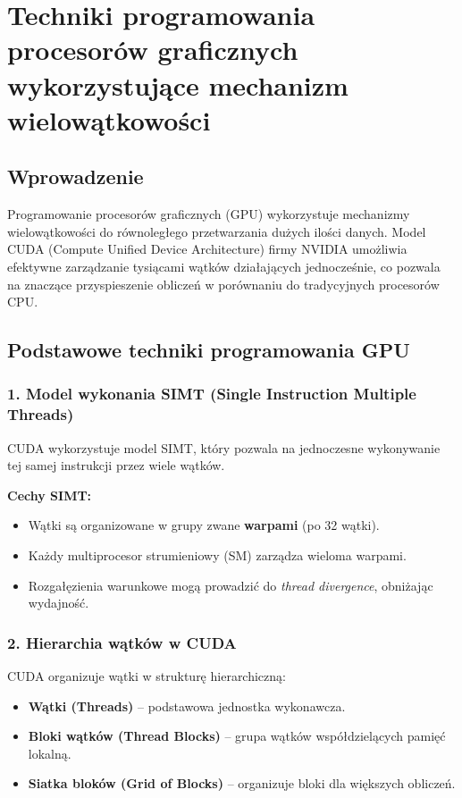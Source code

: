 \section{Techniki programowania procesorów graficznych wykorzystujące mechanizm wielowątkowości}

\subsection{Wprowadzenie}
Programowanie procesorów graficznych (GPU) wykorzystuje mechanizmy wielowątkowości do równoległego przetwarzania dużych ilości danych. Model CUDA (Compute Unified Device Architecture) firmy NVIDIA umożliwia efektywne zarządzanie tysiącami wątków działających jednocześnie, co pozwala na znaczące przyspieszenie obliczeń w porównaniu do tradycyjnych procesorów CPU.

\subsection{Podstawowe techniki programowania GPU}

\subsubsection{1. Model wykonania SIMT (Single Instruction Multiple Threads)}
CUDA wykorzystuje model SIMT, który pozwala na jednoczesne wykonywanie tej samej instrukcji przez wiele wątków.

\textbf{Cechy SIMT:}
\begin{itemize}
    \item Wątki są organizowane w grupy zwane \textbf{warpami} (po 32 wątki).
    \item Każdy multiprocesor strumieniowy (SM) zarządza wieloma warpami.
    \item Rozgałęzienia warunkowe mogą prowadzić do \textit{thread divergence}, obniżając wydajność.
\end{itemize}

\subsubsection{2. Hierarchia wątków w CUDA}
CUDA organizuje wątki w strukturę hierarchiczną:
\begin{itemize}
    \item \textbf{Wątki (Threads)} – podstawowa jednostka wykonawcza.
    \item \textbf{Bloki wątków (Thread Blocks)} – grupa wątków współdzielących pamięć lokalną.
    \item \textbf{Siatka bloków (Grid of Blocks)} – organizuje bloki dla większych obliczeń.
\end{itemize}

